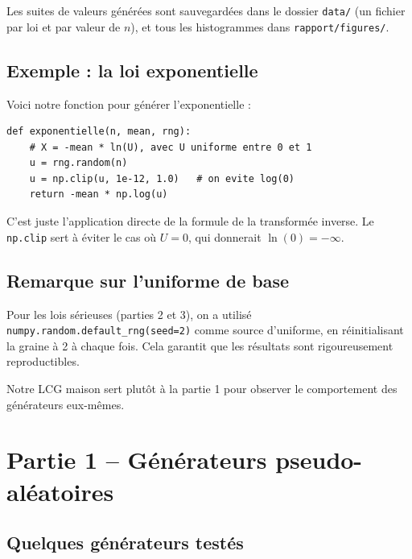 \documentclass[11pt,a4paper]{article}
\begin{document}
Les suites de valeurs g\'en\'er\'ees sont sauvegard\'ees dans le dossier
\texttt{data/} (un fichier par loi et par valeur de $n$), et tous les
histogrammes dans \texttt{rapport/figures/}.

\subsection{Exemple : la loi exponentielle}

Voici notre fonction pour g\'en\'erer l'exponentielle :

\begin{lstlisting}[caption={Loi exponentielle par transform\'ee inverse.}]
def exponentielle(n, mean, rng):
    # X = -mean * ln(U), avec U uniforme entre 0 et 1
    u = rng.random(n)
    u = np.clip(u, 1e-12, 1.0)   # on evite log(0)
    return -mean * np.log(u)
\end{lstlisting}

C'est juste l'application directe de la formule de la transform\'ee inverse.
Le \texttt{np.clip} sert \`a \'eviter le cas o\`u $U = 0$, qui donnerait
$\ln(0) = -\infty$.

\subsection{Remarque sur l'uniforme de base}

Pour les lois \og s\'erieuses\fg{} (parties 2 et 3), on a utilis\'e
\texttt{numpy.random.default\_rng(seed=2)} comme source d'uniforme, en
r\'einitialisant la graine \`a 2 \`a chaque fois. Cela garantit que les
r\'esultats sont rigoureusement reproductibles.

Notre LCG \og maison\fg{} sert plut\^ot \`a la partie 1 pour observer le
comportement des g\'en\'erateurs eux-m\^emes.

\section{Partie 1 -- G\'en\'erateurs pseudo-al\'eatoires}
\label{sec:prng}

\subsection{Quelques g\'en\'erateurs test\'es}
\end{document}
